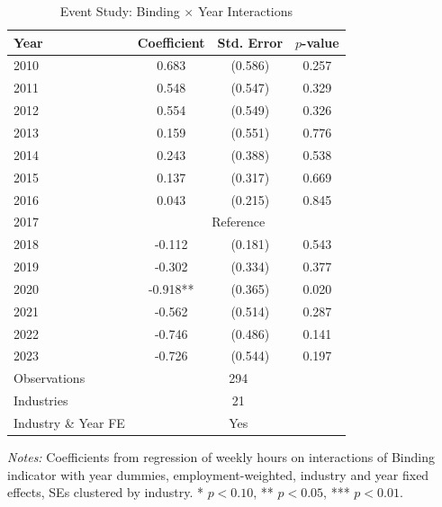 \begin{table}[t]
\centering
\caption{Event Study: Binding $\times$ Year Interactions}
\label{tab:eventstudy}
\begin{tabular}{lccc}
\hline\hline
Year & Coefficient & Std. Error & $p$-value \\
\hline
2010 & 0.683 & (0.586) & 0.257 \\
2011 & 0.548 & (0.547) & 0.329 \\
2012 & 0.554 & (0.549) & 0.326 \\
2013 & 0.159 & (0.551) & 0.776 \\
2014 & 0.243 & (0.388) & 0.538 \\
2015 & 0.137 & (0.317) & 0.669 \\
2016 & 0.043 & (0.215) & 0.845 \\
2017 & \multicolumn{3}{c}{Reference} \\
2018 & -0.112 & (0.181) & 0.543 \\
2019 & -0.302 & (0.334) & 0.377 \\
2020 & -0.918** & (0.365) & 0.020 \\
2021 & -0.562 & (0.514) & 0.287 \\
2022 & -0.746 & (0.486) & 0.141 \\
2023 & -0.726 & (0.544) & 0.197 \\
\hline
Observations & \multicolumn{3}{c}{294} \\
Industries & \multicolumn{3}{c}{21} \\
Industry \& Year FE & \multicolumn{3}{c}{Yes} \\
\hline\hline
\end{tabular}
\begin{tablenotes}
\small
\item \textit{Notes:} Coefficients from regression of weekly hours on interactions of Binding indicator with year dummies, employment-weighted, industry and year fixed effects, SEs clustered by industry. * $p<0.10$, ** $p<0.05$, *** $p<0.01$.
\end{tablenotes}
\end{table}
